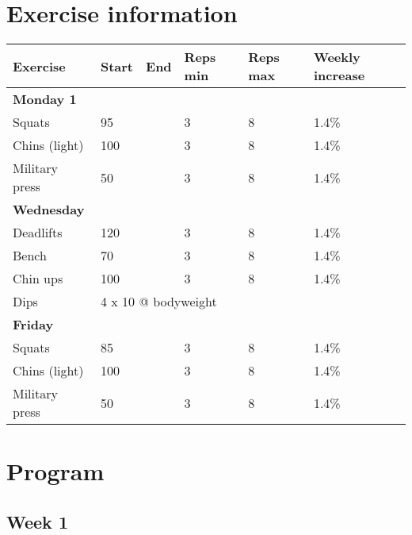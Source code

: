 \documentclass[12pt, a4paper]{article}%
\begin{document}
\section*{Exercise information}
\begin{tabular}{llllll}
    \textbf{Exercise} & \textbf{Start} & \textbf{End} & \textbf{Reps min}
    & \textbf{Reps max} & \textbf{Weekly increase} \\ \hline
      \textbf{ Monday 1 } & & & & & \\ \hline
        \hspace{0.5em}Squats & 95  &
           & 3 & 8 &
          1.4\%\\
        \hspace{0.5em}Chins (light) & 100  &
           & 3 & 8 &
          1.4\%\\
        \hspace{0.5em}Military press & 50  &
           & 3 & 8 &
          1.4\%\\
      \textbf{ Wednesday } & & & & & \\ \hline
        \hspace{0.5em}Deadlifts & 120  &
           & 3 & 8 &
          1.4\%\\
        \hspace{0.5em}Bench & 70  &
           & 3 & 8 &
          1.4\%\\
        \hspace{0.5em}Chin ups & 100  &
           & 3 & 8 &
          1.4\%\\
       \hspace{0.5em}Dips & \multicolumn{ 5 }{l}{ 4 x 10 @ bodyweight } \\
      \textbf{ Friday } & & & & & \\ \hline
        \hspace{0.5em}Squats & 85  &
           & 3 & 8 &
          1.4\%\\
        \hspace{0.5em}Chins (light) & 100  &
           & 3 & 8 &
          1.4\%\\
        \hspace{0.5em}Military press & 50  &
           & 3 & 8 &
          1.4\%\\
\end{tabular}


\clearpage
\section*{Program}
 \subsection*{\hspace{0.25em} Week 1 }
\end{document}
